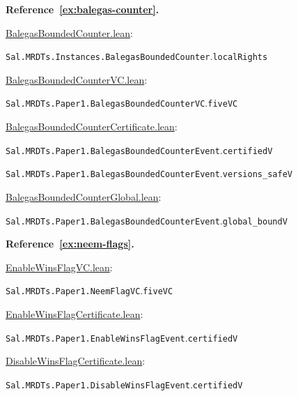 \medskip\noindent\textbf{Reference~\ref{ex:balegas-counter}.}\par\nobreak
\noindent\href{https://github.com/fplaunchpad/sal/blob/paper1/Sal/MRDTs/Instances/BalegasBoundedCounter.lean}{BalegasBoundedCounter.lean}:\par
{\small\nolinkurl{Sal.MRDTs.Instances.BalegasBoundedCounter}.\allowbreak\nolinkurl{localRights}}\par
\noindent\href{https://github.com/fplaunchpad/sal/blob/paper1/Sal/MRDTs/Paper1/BalegasBoundedCounterVC.lean}{BalegasBoundedCounterVC.lean}:\par
{\small\nolinkurl{Sal.MRDTs.Paper1.BalegasBoundedCounterVC}.\allowbreak\nolinkurl{fiveVC}}\par
\noindent\href{https://github.com/fplaunchpad/sal/blob/paper1/Sal/MRDTs/Paper1/BalegasBoundedCounterCertificate.lean}{BalegasBoundedCounterCertificate.lean}:\par
{\small\nolinkurl{Sal.MRDTs.Paper1.BalegasBoundedCounterEvent}.\allowbreak\nolinkurl{certifiedV}}\par
{\small\nolinkurl{Sal.MRDTs.Paper1.BalegasBoundedCounterEvent}.\allowbreak\nolinkurl{versions_safeV}}\par
\noindent\href{https://github.com/fplaunchpad/sal/blob/paper1/Sal/MRDTs/Paper1/BalegasBoundedCounterGlobal.lean}{BalegasBoundedCounterGlobal.lean}:\par
{\small\nolinkurl{Sal.MRDTs.Paper1.BalegasBoundedCounterEvent}.\allowbreak\nolinkurl{global_boundV}}\par

\medskip\noindent\textbf{Reference~\ref{ex:neem-flags}.}\par\nobreak
\noindent\href{https://github.com/fplaunchpad/sal/blob/paper1/Sal/MRDTs/Paper1/EnableWinsFlagVC.lean}{EnableWinsFlagVC.lean}:\par
{\small\nolinkurl{Sal.MRDTs.Paper1.NeemFlagVC}.\allowbreak\nolinkurl{fiveVC}}\par
\noindent\href{https://github.com/fplaunchpad/sal/blob/paper1/Sal/MRDTs/Paper1/EnableWinsFlagCertificate.lean}{EnableWinsFlagCertificate.lean}:\par
{\small\nolinkurl{Sal.MRDTs.Paper1.EnableWinsFlagEvent}.\allowbreak\nolinkurl{certifiedV}}\par
\noindent\href{https://github.com/fplaunchpad/sal/blob/paper1/Sal/MRDTs/Paper1/DisableWinsFlagCertificate.lean}{DisableWinsFlagCertificate.lean}:\par
{\small\nolinkurl{Sal.MRDTs.Paper1.DisableWinsFlagEvent}.\allowbreak\nolinkurl{certifiedV}}\par
